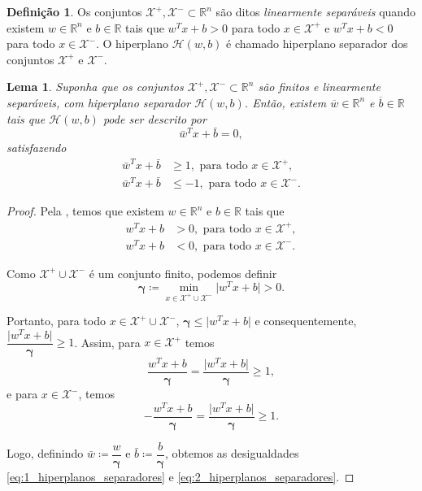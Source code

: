 \documentclass[12pt,a4paper]{scrartcl}
\def\Xset{\mathcal{X}}
\def\Hset{\mathcal{H}}
\def\RR{\mathds{R}}
\def\wbar{\bar{w}}
\def\bbar{\bar{b}}
\newtheorem{lema}{Lema}
\theoremstyle{definition}%
\newtheorem{defi}{Definição}
\begin{document}
\begin{defi} \label{def:dados_linearmente_separaveis} Os conjuntos $\Xset^{+}, \Xset^{-} \subset \RR^n$ são ditos \emph{linearmente separáveis} quando existem $w\in \RR^n$ e $b\in \RR$  tais que $w^{T}x+b>0$ para todo $x\in \Xset^{+}$ e $w^{T}x+b<0$ para todo $x\in \Xset^{-}$. O hiperplano $\Hset(w,b)$ é chamado hiperplano separador dos conjuntos $\Xset^{+}$ e $\Xset^{-}$.
\end{defi}


\begin{lema} \label{lema:hiperplanos_separadores} 
Suponha que os conjuntos $\Xset^{+}, \Xset^{-} \subset \RR^n$ são finitos e linearmente separáveis, com hiperplano separador $\Hset(w,b)$. Então, existem $\overline{w}\in \RR^n$ e $\overline{b}\in \RR$ tais que $\Hset(w,b)$ pode ser descrito por
\[
\wbar^{T}x+\bbar =0,
\]
satisfazendo
\begin{align}
\wbar^{T}x+\bbar &\geq 1, \text{ para todo } x\in \Xset^{+}, \label{eq:1_hiperplanos_separadores} \\
\wbar^{T}x+\bbar &\leq -1, \text{ para todo } x\in \Xset^{-}. \label{eq:2_hiperplanos_separadores}
\end{align}
\end{lema} 

\begin{proof}
Pela  , temos que existem $w\in \RR^n$ e $b\in \RR$ tais que
\begin{align}
w^{T}x+b &>0, \text{ para todo } x\in \Xset^{+}, \\
w^{T}x+b &<0, \text{ para todo } x\in \Xset^{-}.
\end{align}  

Como $\Xset^{+}\cup \Xset^{-}$ é um conjunto finito, podemos definir
\[ \boldsymbol{\gamma} \coloneqq \min_{x\in \Xset^{+}\cup \Xset^{-}} \vert w^{T}x+b\vert  >0. \]

Portanto, para todo $x\in \Xset^{+}\cup \Xset^{-}$, $\boldsymbol{\gamma} \leq \vert w^{T}x+b\vert$ e consequentemente, $\dfrac{\vert w^{T}x+b\vert }{\boldsymbol{\gamma}} \geq 1$. Assim, para $x\in \Xset^{+}$ temos
\[ \dfrac{w^{T}x+b}{\boldsymbol{\gamma}} = \dfrac{\vert w^{T}x+b\vert }{\boldsymbol{\gamma}} \geq 1, \]
e para $x\in \Xset^{-}$, temos
\[- \dfrac{w^{T}x+b}{\boldsymbol{\gamma}} = \dfrac{\vert w^{T}x+b\vert }{\boldsymbol{\gamma}} \geq 1. \]

Logo, definindo $\wbar \coloneqq \dfrac{w}{\boldsymbol{\gamma}}$ e $\bbar \coloneqq \dfrac{b}{\boldsymbol{\gamma}}$, obtemos as desigualdades \eqref{eq:1_hiperplanos_separadores} e \eqref{eq:2_hiperplanos_separadores}. 

\end{proof}
\end{document}
